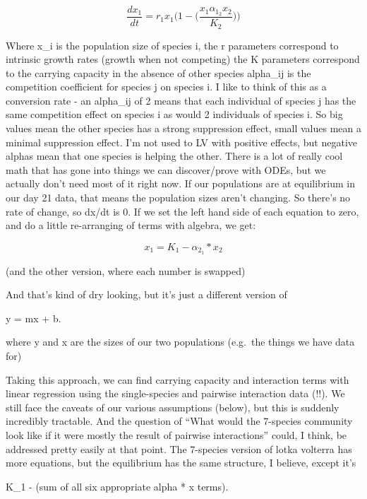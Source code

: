 \documentclass[
]{article}
\begin{document}
\[\frac{dx_1}{dt} = r_1x_1\big(1-\big(\frac{x_1 \alpha_1_2x_2}{K_2}\big)\big)\]

Where x\_i is the population size of species i, the r parameters
correspond to intrinsic growth rates (growth when not competing) the K
parameters correspond to the carrying capacity in the absence of other
species alpha\_ij is the competition coefficient for species j on
species i. I like to think of this as a conversion rate - an alpha\_ij
of 2 means that each individual of species j has the same competition
effect on species i as would 2 individuals of species i. So big values
mean the other species has a strong suppression effect, small values
mean a minimal suppression effect. I'm not used to LV with positive
effects, but negative alphas mean that one species is helping the other.
There is a lot of really cool math that has gone into things we can
discover/prove with ODEs, but we actually don't need most of it right
now. If our populations are at equilibrium in our day 21 data, that
means the population sizes aren't changing. So there's no rate of
change, so dx/dt is 0. If we set the left hand side of each equation to
zero, and do a little re-arranging of terms with algebra, we get:

\[x_1 = K_1 - \alpha_2_1 * x_2\]

(and the other version, where each number is swapped)

And that's kind of dry looking, but it's just a different version of

y = mx + b.

where y and x are the sizes of our two populations (e.g.~the things we
have data for)

Taking this approach, we can find carrying capacity and interaction
terms with linear regression using the single-species and pairwise
interaction data (!!). We still face the caveats of our various
assumptions (below), but this is suddenly incredibly tractable. And the
question of ``What would the 7-species community look like if it were
mostly the result of pairwise interactions'' could, I think, be
addressed pretty easily at that point. The 7-species version of lotka
volterra has more equations, but the equilibrium has the same structure,
I believe, except it's

K\_1 - (sum of all six appropriate alpha * x terms).
\end{document}
